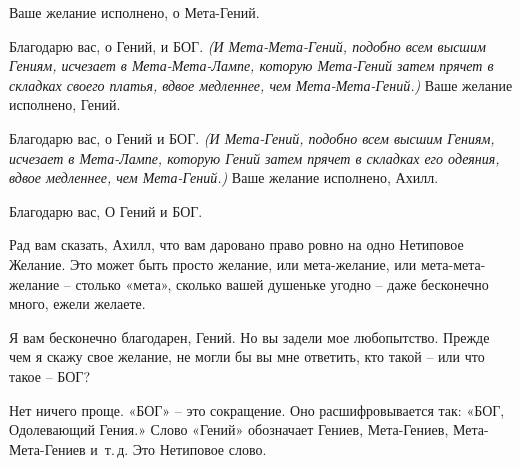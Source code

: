 \documentclass[../main.tex]{subfiles}
\begin{document}
\begin{Dialogue}
\begin{sublevel}
\begin{sublevel}
\begin{sublevel}
\begin{sublevel}

\indent\enspace{}


Ваше желание исполнено, о Мета-Гений.

\end{sublevel}

 Благодарю вас, о Гений, и БОГ\@. \emph{(И Мета-Мета-Гений, подобно всем высшим Гениям, исчезает в Мета-Мета-Лампе, которую Мета-Гений затем прячет в складках своего платья, вдвое медленнее, чем Мета-Мета-Гений.)} Ваше желание исполнено, Гений.

\end{sublevel}

 Благодарю вас, о Гений и БОГ\@. \emph{(И Мета-Гений, подобно всем высшим Гениям, исчезает в Мета-Лампе, которую Гений затем прячет в складках его одеяния, вдвое медленнее, чем Мета-Гений.)} Ваше желание исполнено, Ахилл.


 Благодарю вас, О Гений и БОГ\@.

 Рад вам сказать, Ахилл, что вам даровано право ровно на одно Нетиповое Желание. Это может быть просто желание, или мета-желание, или мета-мета-желание \--- столько «мета», сколько вашей душеньке угодно \--- даже бесконечно много, ежели желаете.

 Я вам бесконечно благодарен, Гений. Но вы задели мое любопытство. Прежде чем я скажу свое желание, не могли бы вы мне ответить, кто такой \--- или что такое \--- БОГ?

 Нет ничего проще. «БОГ» \--- это сокращение. Оно расшифровывается так: «БОГ, Одолевающий Гения.» Слово \mbox{«Гений»} обозначает Гениев, Мета-Гениев, Мета-Мета-Гениев и~т.\,д. Это Нетиповое слово.


\end{sublevel}
\end{sublevel}
\end{Dialogue}
\end{document}
